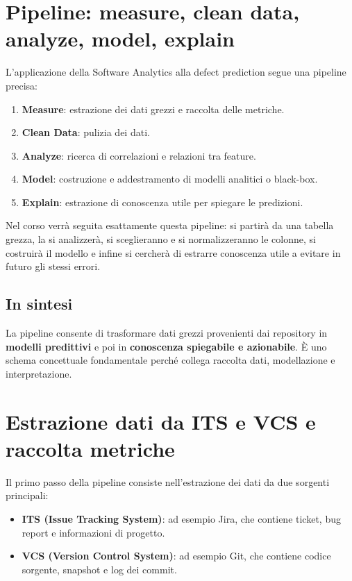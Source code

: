 \section{Pipeline: measure, clean data, analyze, model, explain}

L'applicazione della Software Analytics alla defect prediction segue una pipeline precisa:
\begin{enumerate}
    \item \textbf{Measure}: estrazione dei dati grezzi e raccolta delle metriche.
    \item \textbf{Clean Data}: pulizia dei dati.
    \item \textbf{Analyze}: ricerca di correlazioni e relazioni tra feature.
    \item \textbf{Model}: costruzione e addestramento di modelli analitici o black-box.
    \item \textbf{Explain}: estrazione di conoscenza utile per spiegare le predizioni.
\end{enumerate}

\begin{notaprof}
Nel corso verrà seguita esattamente questa pipeline: si partirà da una tabella grezza, la si analizzerà, si sceglieranno e si normalizzeranno le colonne, si costruirà il modello e infine si cercherà di estrarre conoscenza utile a evitare in futuro gli stessi errori.
\end{notaprof}

\subsection*{In sintesi}
La pipeline consente di trasformare dati grezzi provenienti dai repository in \textbf{modelli predittivi} e poi in \textbf{conoscenza spiegabile e azionabile}. È uno schema concettuale fondamentale perché collega raccolta dati, modellazione e interpretazione.

\section{Estrazione dati da ITS e VCS e raccolta metriche}

Il primo passo della pipeline consiste nell'estrazione dei dati da due sorgenti principali:
\begin{itemize}
    \item \textbf{ITS (Issue Tracking System)}: ad esempio Jira, che contiene ticket, bug report e informazioni di progetto.
    \item \textbf{VCS (Version Control System)}: ad esempio Git, che contiene codice sorgente, snapshot e log dei commit.
\end{itemize}

